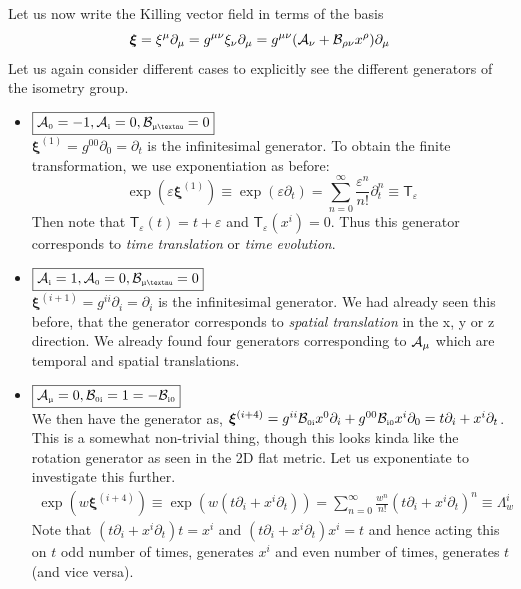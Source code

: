 \\[0.2cm]
Let us now write the Killing vector field in terms of the basis
$$\boldsymbol{\xi} = \xi^\mu \partial_\mu = g^{\mu\nu}\xi_\nu\partial_\mu=g^{\mu\nu}\qty(\mathcal A_{\nu}+\mathcal B_{\rho\nu}x^\rho)\partial_\mu $$
Let us again consider different cases to explicitly see the different generators of the isometry group. 
\begin{itemize}[label=$\triangleright$]
    \item $\boxed{\SA\tund{0}=-1,\SA\tund{i}=0, \SB\tund{\textmu\textnu}=0}$ \\[0.2cm]
    $\boldsymbol{\xi}^{(1)}= g^{00}\partial_0 = \partial_t$ is the infinitesimal generator. To obtain the finite transformation, we use exponentiation as before:
    $$\exp(\varepsilon \boldsymbol{\xi}^{(1)})\equiv \exp(\varepsilon \partial_t) = \sum\limits_{n=0}^\infty \frac{\varepsilon^n}{n!}\partial_t^n \equiv \mathsf{T}_\varepsilon$$
    Then note that $\mathsf{T}_\varepsilon(t) = t +\varepsilon$ and $\mathsf{T}_\varepsilon(x^i) =0$. Thus this generator corresponds to \textit{time translation} or \textit{time evolution}.
    \item $\boxed{\SA\tund{i}=1,\SA\tund{0}=0, \SB\tund{\textmu\textnu}=0}$ \\[0.2cm]
    $\boldsymbol{\xi}^{(i+1)}= g^{ii}\partial_i = \partial_i$ is the infinitesimal generator. We had already seen this before, that the generator corresponds to \textit{spatial translation} in the x, y or z direction. We already found four generators corresponding to $\mathcal A_\mu$ which are temporal and spatial translations.  
     \item $\boxed{\SA\tund{\textmu}=0, \SB\tund{0i}=1 = -\SB\tund{i0} }$ \\[0.2cm]
     We then have the generator as, $\boldsymbol{\xi}^{(i+4)} = g^{ii}\mathcal B_{\text{\tiny 0i}}x^0\partial_i + g^{00}\mathcal B_{\text{\tiny i0}}x^i\partial_0=t\partial_i+x^i\partial_t$. This is a somewhat non-trivial thing, though this looks kinda like the rotation generator as seen in the 2D flat metric. Let us exponentiate to investigate this further. 
     \begin{align*}
        \exp(w\boldsymbol{\xi}^{(i+4)}) \equiv \exp(w(t\partial_i+x^i\partial_t)) = \sum\limits_{n=0}^\infty \frac{w^n}{n!}(t\partial_i+x^i\partial_t)^n \equiv \Lambda_w^i
     \end{align*}
     Note that $(t\partial_i + x^i\partial_t)t =x^i$ and  $(t \partial_i + x^i\partial_t)x^i =t$ and hence acting this on $t$ odd number of times, generates $x^i$ and even number of times, generates $t$ (and vice versa). 

\end{itemize}
